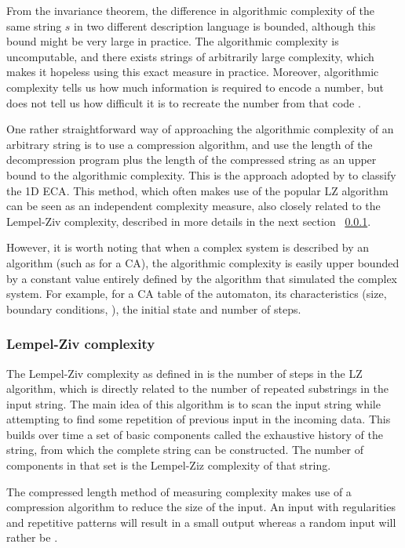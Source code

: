 From the invariance theorem, the difference in algorithmic complexity of the same
string $s$ in two different description language is bounded, although this bound
might be very large in practice. The algorithmic complexity is uncomputable, and
there exists strings of arbitrarily large complexity, which makes it hopeless
using this exact measure in practice. Moreover, algorithmic complexity tells us
how much information is required to encode a number, but does not tell us how
difficult it is to recreate the number from that code
\parencite{gell-mannSimplicityComplexityDescription1988}.

One rather straightforward way of approaching the algorithmic complexity of an
arbitrary string is to use a compression algorithm, and use the length of the
decompression program plus the length of the compressed string as an upper bound
to the algorithmic complexity. This is the approach adopted by
\textcite{zenilCompressionBasedInvestigationDynamical2010} to classify the 1D
\ac{ECA}. This method, which often makes use of the popular LZ algorithm can be
seen as an independent complexity measure, also closely related to the
Lempel-Ziv complexity, described in more details in the next section
~\ref{subsection:lempel-ziv}.

However, it is worth noting that when a complex system is described by an
algorithm (such as for a \ac{CA}), the algorithmic complexity is easily upper
bounded by a constant value entirely defined by the algorithm that simulated the
complex system. For example, for a \ac{CA} table of the automaton, its
characteristics (size, boundary conditions, \etc), the initial state and number
of steps.

\subsubsection{Lempel-Ziv complexity}\label{subsection:lempel-ziv}
The Lempel-Ziv complexity as defined in
\parencite{lempelComplexityFiniteSequences1976} is the number of steps in the LZ
algorithm, which is directly related to the number of repeated substrings in the
input string. The main idea of this algorithm is to scan the input string while
attempting to find some repetition of previous input in the incoming data. This
builds over time a set of basic components called the exhaustive history of the
string, from which the complete string can be constructed. The number of
components in that set is the Lempel-Ziz complexity of that string.

The compressed length method of measuring complexity makes use of a compression
algorithm to reduce the size of the input. An input with regularities and
repetitive patterns will result in a small output whereas a random input will
rather be .


